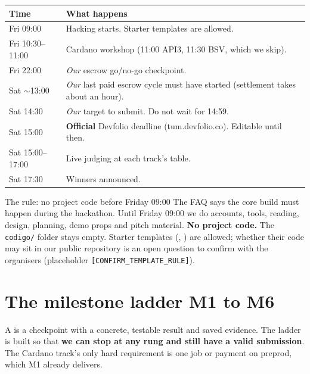 \begin{center}
\small
\begin{tabularx}{\textwidth}{@{}p{3.6cm}X@{}}
\toprule
\textbf{Time} & \textbf{What happens}\\
\midrule
Fri 09:00 & Hacking starts. Starter templates are allowed.\\
Fri 10:30--11:00 & Cardano workshop (11:00 API3, 11:30 BSV, which we skip).\\
Fri 22:00 & \emph{Our} escrow go/no-go checkpoint.\\
Sat $\sim$13:00 & \emph{Our} last paid escrow cycle must have started (settlement takes about an hour).\\
Sat 14:30 & \emph{Our} target to submit. Do not wait for 14:59.\\
Sat 15:00 & \textbf{Official} Devfolio deadline (tum.devfolio.co). Editable until then.\\
Sat 15:00--17:00 & Live judging at each track's table.\\
Sat 17:30 & Winners announced.\\
\bottomrule
\end{tabularx}
\end{center}

\begin{warningbox}{The rule: no project code before Friday 09:00}
The FAQ says the core build must happen during the hackathon. Until Friday 09:00 we do accounts, tools, reading, design, planning, demo props and pitch material. \textbf{No project code.} The \texttt{codigo/} folder stays empty. Starter templates (, ) are allowed; whether their code may sit in our public repository is an open question to confirm with the organisers (placeholder \texttt{[CONFIRM\_TEMPLATE\_RULE]}).
\end{warningbox}

\section{The milestone ladder M1 to M6}
A  is a checkpoint with a concrete, testable result and saved evidence. The ladder is built so that \textbf{we can stop at any rung and still have a valid submission}. The Cardano track's only hard requirement is one job or payment on preprod, which M1 already delivers.

